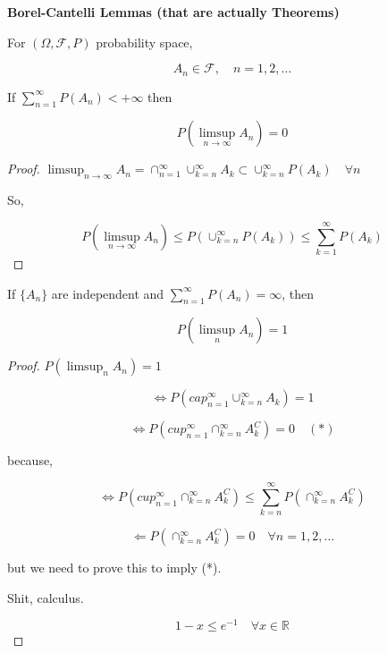 \documentclass[11pt,fleqn]{book} %
\begin{document}
\textbf{Borel-Cantelli Lemmas (that are actually Theorems)}


\begin{theorem}[BC1]	
	For $(\Omega, \mathscr{F}, P)$ probability space, 

	$$A_n \in \mathscr{F}, \quad n= 1, 2, \dots$$

	If $\displaystyle \sum^\infty_{n=1} P(A_n) < + \infty$ then

	$$P(\limsup_{n \rightarrow \infty} A_n) = 0 $$
\end{theorem}	

\begin{proof}
	$\limsup_{n \rightarrow \infty} A_n = \cap^\infty_{n=1} \cup^\infty_{k=n} A_k \subset \cup^\infty_{k=n} P(A_k) \quad \forall n$

	So, 

	$$P(\limsup_{n \rightarrow \infty} A_n) \leq P( \cup^\infty_{k=n} P(A_k)) \leq \sum^\infty_{k=1} P(A_k)$$

\end{proof}

\begin{theorem}[BC2]
	If $\{A_n\}$ are independent and $\displaystyle \sum^\infty_{n=1} P(A_n) = \infty$, then

	$$P(\limsup_n A_n) = 1 $$
\end{theorem}

\begin{proof}
	$P(\limsup_n A_n) = 1$

	$$\Leftrightarrow P(cap^\infty_{n=1} \cup^\infty_{k=n} A_k) = 1 $$

	$$\Leftrightarrow P(cup^\infty_{n=1} \cap^\infty_{k=n} A^C_k) = 0 \quad (*)$$

	because, 

	$$\Leftrightarrow P(cup^\infty_{n=1} \cap^\infty_{k=n} A^C_k) \leq \displaystyle \sum^\infty_{k=n} P(\cap^\infty_{k=n} A_k^C )  $$

	$$\Leftarrow P(\cap^\infty_{k=n} A_k^C ) = 0 \quad \forall n = 1, 2, \dots $$

	but we need to prove this to imply (*). 

	Shit, calculus. 

	$$1 - x \leq e^{-1} \quad \forall x \in \mathbb{R} $$


\end{proof}







\end{document}
